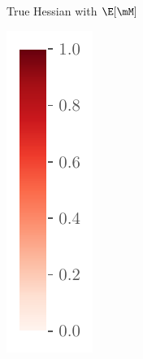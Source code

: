 \begin{figure}[ht]
\begin{subfigure}[t]{0.46\textwidth}
        \caption{True Hessian with $\E[\mM]$}
        \label{fig:Corr_UTAU_True_fc}
    \end{subfigure}%
    \begin{subfigure}[t]{0.065\textwidth}
        \centering
        \includegraphics[width=\textwidth]{Figures/Misc/colorbar.pdf}

\end{subfigure}
\end{figure}
